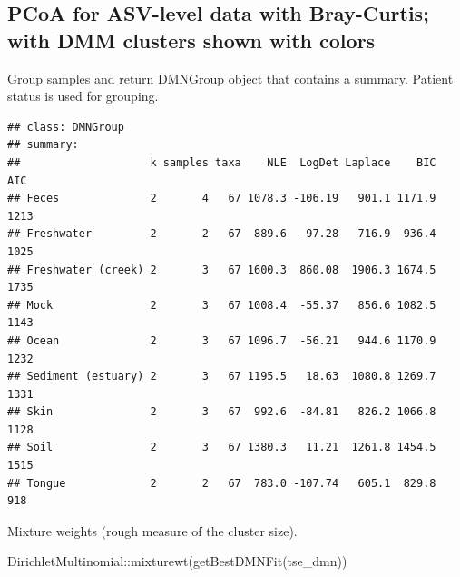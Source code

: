 \documentclass[
]{book}
\newenvironment{Shaded}{\begin{snugshade}}{\end{snugshade}}
\newcommand{\AttributeTok}[1]{\textcolor[rgb]{0.77,0.63,0.00}{#1}}
\newcommand{\DecValTok}[1]{\textcolor[rgb]{0.00,0.00,0.81}{#1}}
\newcommand{\FunctionTok}[1]{\textcolor[rgb]{0.00,0.00,0.00}{#1}}
\newcommand{\NormalTok}[1]{#1}
\newcommand{\OtherTok}[1]{\textcolor[rgb]{0.56,0.35,0.01}{#1}}
\newcommand{\SpecialCharTok}[1]{\textcolor[rgb]{0.00,0.00,0.00}{#1}}
\newcommand{\StringTok}[1]{\textcolor[rgb]{0.31,0.60,0.02}{#1}}
\begin{document}
\hypertarget{pcoa-for-asv-level-data-with-bray-curtis-with-dmm-clusters-shown-with-colors}{%
\subsection{PCoA for ASV-level data with Bray-Curtis; with DMM clusters shown with colors}\label{pcoa-for-asv-level-data-with-bray-curtis-with-dmm-clusters-shown-with-colors}}

Group samples and return DMNGroup object that contains a summary.
Patient status is used for grouping.

\begin{Shaded}
\end{Shaded}

\begin{verbatim}
## class: DMNGroup 
## summary:
##                    k samples taxa    NLE  LogDet Laplace    BIC  AIC
## Feces              2       4   67 1078.3 -106.19   901.1 1171.9 1213
## Freshwater         2       2   67  889.6  -97.28   716.9  936.4 1025
## Freshwater (creek) 2       3   67 1600.3  860.08  1906.3 1674.5 1735
## Mock               2       3   67 1008.4  -55.37   856.6 1082.5 1143
## Ocean              2       3   67 1096.7  -56.21   944.6 1170.9 1232
## Sediment (estuary) 2       3   67 1195.5   18.63  1080.8 1269.7 1331
## Skin               2       3   67  992.6  -84.81   826.2 1066.8 1128
## Soil               2       3   67 1380.3   11.21  1261.8 1454.5 1515
## Tongue             2       2   67  783.0 -107.74   605.1  829.8  918
\end{verbatim}

Mixture weights (rough measure of the cluster size).

\begin{Shaded}
\begin{Highlighting}[]
\NormalTok{DirichletMultinomial}\SpecialCharTok{::}\FunctionTok{mixturewt}\NormalTok{(}\FunctionTok{getBestDMNFit}\NormalTok{(tse\_dmn))}
\end{Highlighting}
\end{Shaded}
\end{document}
